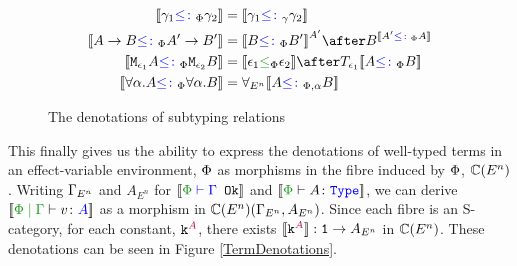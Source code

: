 \documentclass{Report}
\begin{document}
\begin{figure}[H]
    \centering
    \begin{framed}
        \begin{align*}
            \deno{\g_1\subtypep \g_2} &= \deno{\g_1\subtypeg \g_2}
            \\
            \deno{\ab \subtypep \fntype{A'}{B'}} &= \deno{B\subtypep B'}^{A'}\after B^{\deno{A'\subtypep A}}
            \\
            \deno{\M{\e_1}{A}\subtypep\M{\e_2}{B}} &= \deno{\e_1\subeffectp\e_2}\after\T{\e_1}{\deno{A\subtypep B}}
            \\
            \deno{\all{\a}{A}\subtypep\all{\a}{B}} &= \allEn{\deno{A\subtypepa B}}
        \end{align*}
    \end{framed}
    
    \caption{The denotations of subtyping relations}
    \label{SubtypingDenotations}
\end{figure}


This finally gives us the ability to express the denotations of well-typed terms in an effect-variable environment, $\P$ as morphisms in the fibre induced by $\P$, $\C(E^n)$.  Writing $\G_{E^n}$ and $A_{E^n}$ for $\deno{\wellformedok{\P}{\G}}$ and $\deno{\typerelation{\P}{A}{\type}}$, we can derive $\deno{\gpetyperelation{v}{A}}$ as a morphism in $\C(E^n)(\G_{E^n}, A_{E^n})$. Since each fibre is an S-category, for each constant, $\const{A}$, there exists $\deno{\const{A}}: \1 \rightarrow A_{E^n}$ in $\C(E^n)$. These denotations can be seen in Figure \ref{TermDenotations}.
\end{document}
